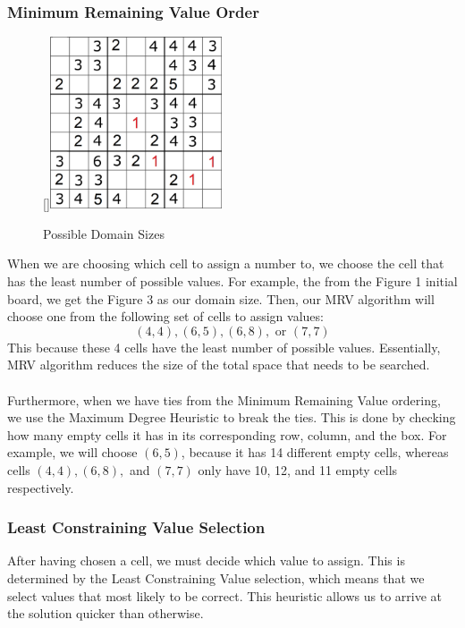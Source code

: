 \documentclass[12pt, a4paper]{article}
\begin{document}
			\subsubsection{Minimum Remaining Value Order}
				\begin{figure}
					\begin{center}
						\raisebox{0pt}[\dimexpr{}\baselineskip\relax]{\includegraphics[width=2in]{sample_9_by_9_domain_size.png}}
					\end{center}
					\caption{Possible Domain Sizes}
				\end{figure}
				When we are choosing which cell to assign a number to, we choose the cell that has the least number of possible values. For example, the from the Figure 1 initial board, we get the Figure 3 as our domain size. Then, our MRV algorithm will choose one from the following set of cells to assign values:
				$$(4, 4), (6, 5), (6, 8), \text{ or } (7, 7)$$
				This because these 4 cells have the least number of possible values. Essentially, MRV algorithm reduces the size of the total space that needs to be searched.\\\\
				Furthermore, when we have ties from the Minimum Remaining Value ordering, we use the Maximum Degree Heuristic to break the ties. This is done by checking how many empty cells it has in its corresponding row, column, and the box. For example, we will choose $(6, 5)$, because it has 14 different empty cells, whereas cells $(4, 4), (6, 8),$ and $(7, 7)$ only have 10, 12, and 11 empty cells respectively.
			\subsubsection{Least Constraining Value Selection}
				After having chosen a cell, we must decide which value to assign. This is determined by the Least Constraining Value selection, which means that we select values that most likely to be correct. This heuristic allows us to arrive at the solution quicker than otherwise.
\end{document}

